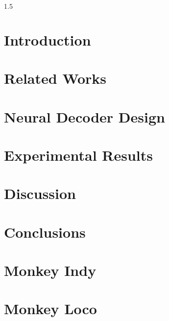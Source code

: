 \documentclass[12pt, a4paper, oneside]{book} %
\begin{document}
\begin{spacing}{1.5}
\begin{singlespace}
		\mbox{}
		\newpage
		
		\printnomenclature
		
		
		\end{singlespace}
		\mainmatter
		\chapter{Introduction}
		\label{chap:Introduction}
		
		\chapter{Related Works}
		\label{chap:Related_work}
		
		\chapter{Neural Decoder Design}
		\label{chap:Neural_decoder_design}
		
		\chapter{Experimental Results}
		\label{chap:Experimental_results}
		
		\chapter{Discussion}
		\label{chap:Discussion}
		
		\chapter{Conclusions}
		\label{chap:Conclusion}
		
		\begin{singlespace}
			\clearpage

			\renewcommand{\bibname}{References}

			
			\clearpage
		\end{singlespace}
		\begin{appendices}
			\chapter{Monkey Indy}
			
			\chapter{Monkey Loco}
			
		\end{appendices}
		\backmatter
	\end{spacing}
\end{document}
